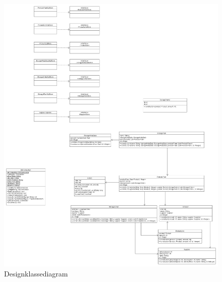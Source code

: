 \begin{landscape}
    \begin{figure}
        \centering
        \includegraphics[width=0.6\hsize]{figures/design/designclassdiagram.png}
        \caption{Designklassediagram}
        \label{fig:designklassediagram}
    \end{figure}
\end{landscape}

